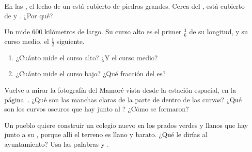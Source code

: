 \begin{exercise}[$\star$]\label{exo:g5:water-shapes-the-land:6}
En las , el lecho de un  está cubierto de piedras grandes. Cerca
del , está cubierto de  y . ¿Por qué?
\end{exercise}

\begin{exercise}[$\star\star$]\label{exo:g5:water-shapes-the-land:7}
Un  mide 600 kilómetros de largo. Su curso alto es el primer
$\frac{1}{6}$ de su longitud, y su curso medio, el $\frac{1}{2}$
siguiente.
\begin{enumerate}
  \item[(a)] ¿Cuánto mide el curso alto? ¿Y el curso medio?
  \item[(b)] ¿Cuánto mide el curso bajo? ¿Qué fracción del  es?
\end{enumerate}
\end{exercise}

\begin{exercise}[$\star\star$]\label{exo:g5:water-shapes-the-land:8}
Vuelve a mirar la fotografía del  Mamoré vista desde la estación
espacial, en la página~\pageref{fig:g5:water-shapes-the-land:mamore}. ¿Qué
son las manchas claras de la parte de dentro de las curvas? ¿Qué son los
 curvos oscuros que hay junto al ? ¿Cómo se formaron?
\end{exercise}

\begin{exercise}[$\star\star$]\label{exo:g5:water-shapes-the-land:9}
Un pueblo quiere construir un colegio nuevo en los prados verdes y llanos
que hay junto a su , porque allí el terreno es llano y barato. ¿Qué le
dirías al ayuntamiento? Usa las palabras \emph{} y \emph{}.
\end{exercise}

